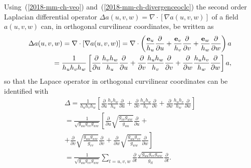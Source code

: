 Using~(\ref{2018-mm-ch-veo}) and~(\ref{2018-mm-ch-divergenceoclc})
the second order Laplacian differential operator
$\Delta a(u,v,w) = \nabla \cdot [\nabla a(u,v,w)]$  of a  field
$a(u,v,w)$ can,
in   orthogonal curvilinear coordinates,
be written as
\begin{equation}
\begin{split}
\Delta a(u,v,w) = \nabla \cdot [\nabla a(u,v,w)]=
\nabla \cdot
\left(
\frac{{\bf e}_u}{h_u}  \frac{\partial   }{\partial u}    +
\frac{{\bf e}_v}{h_v}  \frac{\partial   }{\partial v}      +
\frac{{\bf e}_w}{h_w} \frac{\partial   }{\partial w}
\right) a \\
=
\frac{ 1 }{h_u h_v h_w}
\left[
\frac{\partial   }{\partial u} \frac{h_v h_w}{h_u}\frac{\partial   }{\partial u}  +
\frac{\partial   }{\partial v} \frac{h_u h_w}{h_v}\frac{\partial   }{\partial v}  +
\frac{\partial   }{\partial w} \frac{h_u h_v}{h_w}\frac{\partial   }{\partial w}
\right] a
,
\end{split}
\label{2018-mm-ch-laplaceocc}
\end{equation}
so that the Lapace operator
in   orthogonal curvilinear coordinates can be identified with
\begin{equation}
\begin{split}
\Delta
=
\frac{ 1 }{h_u h_v h_w}
\left[
\frac{\partial   }{\partial u} \frac{h_v h_w}{h_u}\frac{\partial   }{\partial u}  +
\frac{\partial   }{\partial v} \frac{h_u h_w}{h_v}\frac{\partial   }{\partial v}  +
\frac{\partial   }{\partial w} \frac{h_u h_v}{h_w}\frac{\partial   }{\partial w}
\right]
\\
=
\frac{ 1 }{\sqrt{ g_{uu}  g_{vv} g_{ww} }}
\left[
\frac{\partial   }{\partial u} \sqrt{  \frac{g_{vv} g_{ww}  }{  g_{uu}  }}\frac{\partial   }{\partial u}  +
\right.  \qquad \qquad  \\  + \left.
\frac{\partial   }{\partial v} \sqrt{ \frac{g_{uu}   g_{ww}  }{  g_{vv} }}\frac{\partial   }{\partial v}  +
\frac{\partial   }{\partial w} \sqrt{ \frac{g_{uu}  g_{vv}   }{   g_{ww} }}\frac{\partial   }{\partial w}
\right] \\
=
\frac{ 1 }{\sqrt{ g_{uu}  g_{vv} g_{ww} }}
\sum_{t=u,v,w}
\frac{\partial   }{\partial t}  \frac{\sqrt{ g_{uu}  g_{vv} g_{ww} }}{g_{tt}}\frac{\partial   }{\partial t}
.
\end{split}
\label{2018-mm-ch-laplaceoc}
\end{equation}

